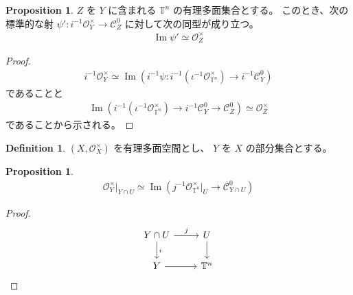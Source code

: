 \documentclass[a4paper,dvipdfmx,reqno,12pt]{amsart}
\theoremstyle{definition}
\newtheorem{definition}[theorem]{Definition}
\newtheorem{proposition}[theorem]{Proposition}
\newcommand{\opn}[1]{\operatorname{#1}}
\numberwithin{equation}{section}
\begin{document}
\begin{proposition}
$Z$ を $Y$ に含まれる $\mathbb{T}^{n}$ の有理多面集合とする。
このとき、次の標準的な射 
$\psi' \colon i^{-1}\mathcal{O}^{\times}_{Y} \to 
\mathcal{C}_{Z}^{0}$
に対して次の同型が成り立つ。
\begin{align}
\opn{Im}\psi' \simeq \mathcal{O}^{\times}_{Z}
\end{align}
\end{proposition}

\begin{proof}

\begin{align}
i^{-1}\mathcal{O}^{\times}_{Y}
\simeq \opn{Im}(i^{-1}\psi\colon i^{-1}(\iota^{-1}\mathcal{O}^{\times}_{\mathbb{T}^{n}})
\to i^{-1} \mathcal{C}_Y^{0}) 
\end{align}
であることと
\begin{align}
\opn{Im}(i^{-1}(\iota^{-1}\mathcal{O}^{\times}_{\mathbb{T}^{n}})
\to i^{-1} \mathcal{C}_Y^{0}
\to \mathcal{C}_Z^{0})\simeq \mathcal{O}_Z^{\times}
\end{align}
であることから示される。
\end{proof}

     
\begin{definition}
$(X,\mathcal{O}_X^{\times})$ を有理多面空間とし、
$Y$ を $X$ の部分集合とする。
\end{definition}

\begin{proposition}


\begin{align}
\mathcal{O}_Y^{\times}|_{Y\cap U}\simeq 
\opn{Im}(j^{-1}\mathcal{O}_{\mathbb{T}^{n}}^{\times}|_{U}\to \mathcal{C}_{Y\cap U}^{0})
\end{align}


\end{proposition}

\begin{proof}

\[\begin{tikzcd}
	{Y\cap U} & U \\
	Y & {\mathbb{T}^{n}}
	\arrow[from=1-1, to=2-1, "i"]
	\arrow[from=1-1, to=1-2, "j"]
	\arrow[from=2-1, to=2-2]
	\arrow[from=1-2, to=2-2]
\end{tikzcd}\]

\end{proof}
\end{document}
